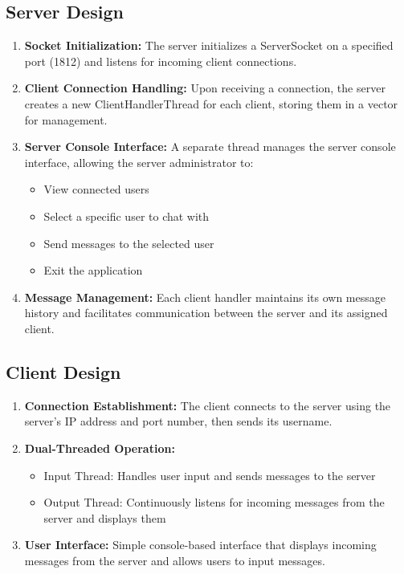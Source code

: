 \documentclass[12pt,a4paper]{article}
\begin{document}
\subsection{Server Design}
\begin{enumerate}
    \item \textbf{Socket Initialization:} The server initializes a ServerSocket on a specified port (1812) and listens for incoming client connections.
    
    \item \textbf{Client Connection Handling:} Upon receiving a connection, the server creates a new ClientHandlerThread for each client, storing them in a vector for management.
    
    \item \textbf{Server Console Interface:} A separate thread manages the server console interface, allowing the server administrator to:
    \begin{itemize}
        \item View connected users
        \item Select a specific user to chat with
        \item Send messages to the selected user
        \item Exit the application
    \end{itemize}
    
    \item \textbf{Message Management:} Each client handler maintains its own message history and facilitates communication between the server and its assigned client.
\end{enumerate}

\subsection{Client Design}
\begin{enumerate}
    \item \textbf{Connection Establishment:} The client connects to the server using the server's IP address and port number, then sends its username.
    
    \item \textbf{Dual-Threaded Operation:}
    \begin{itemize}
        \item Input Thread: Handles user input and sends messages to the server
        \item Output Thread: Continuously listens for incoming messages from the server and displays them
    \end{itemize}
    
    \item \textbf{User Interface:} Simple console-based interface that displays incoming messages from the server and allows users to input messages.
\end{enumerate}
\end{document}
